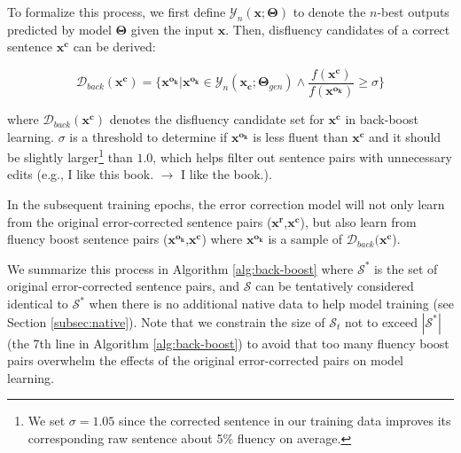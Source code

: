 \documentclass{article} %
\begin{document}
To formalize this process, we first define $\mathcal{Y}_n(\boldsymbol{x};\boldsymbol{\Theta})$ to denote the $n$-best outputs predicted by model $\boldsymbol{\Theta}$ given the input $\boldsymbol{x}$. Then, disfluency candidates of a correct sentence $\boldsymbol{x^c}$ can be derived:

\vspace{-0.2cm}
\begin{equation}\label{eq:dback}
\mathcal{D}_{back}(\boldsymbol{x^c}) = \{ \boldsymbol{x^{o_k}} | \boldsymbol{x^{o_k}} \in \mathcal{Y}_n(\boldsymbol{x_c};\boldsymbol{\Theta}_{gen}) \wedge \frac{f(\boldsymbol{x^{c}})}{f(\boldsymbol{x^{o_k}})} \ge \sigma  \}
\end{equation}

\noindent where $\mathcal{D}_{back}(\boldsymbol{x^c})$ denotes the disfluency candidate set for $\boldsymbol{x^c}$ in back-boost learning. $\sigma$ is a threshold to determine if $\boldsymbol{x^{o_k}}$ is less fluent than $\boldsymbol{x^c}$ and it should be slightly larger\footnote{We set $\sigma=1.05$ since the corrected sentence in our training data improves its corresponding raw sentence about 5\% fluency on average.} than $1.0$, which helps filter out sentence pairs with unnecessary edits (e.g., I like this book. $\to$ I like the book.).

In the subsequent training epochs, the error correction model will not only learn from the original error-corrected sentence pairs ($\boldsymbol{x^r}$,$\boldsymbol{x^c}$), but also learn from fluency boost sentence pairs ($\boldsymbol{x^{o_k}}$,$\boldsymbol{x^c}$) where $\boldsymbol{x^{o_k}}$ is a sample of $\mathcal{D}_{back}(\boldsymbol{x^c}$).

We summarize this process in Algorithm \ref{alg:back-boost} where $\mathcal{S}^*$ is the set of original error-corrected sentence pairs, and $\mathcal{S}$ can be tentatively considered identical to $\mathcal{S}^*$ when there is no additional native data to help model training (see Section \ref{subsec:native}). Note that we constrain the size of $\mathcal{S}_t$ not to exceed $|\mathcal{S}^*|$ (the 7th line in Algorithm \ref{alg:back-boost}) to avoid that too many fluency boost pairs overwhelm the effects of the original error-corrected pairs on model learning.
\end{document}
